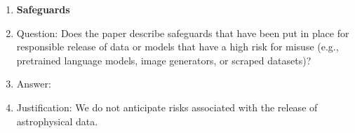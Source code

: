 \begin{enumerate}
\item {\bf Safeguards}
    \item[] Question: Does the paper describe safeguards that have been put in place for responsible release of data or models that have a high risk for misuse (e.g., pretrained language models, image generators, or scraped datasets)?
    \item[] Answer: \answerNA{} %
    \item[] Justification: We do not anticipate risks associated with the release of astrophysical data. 


\end{enumerate}
